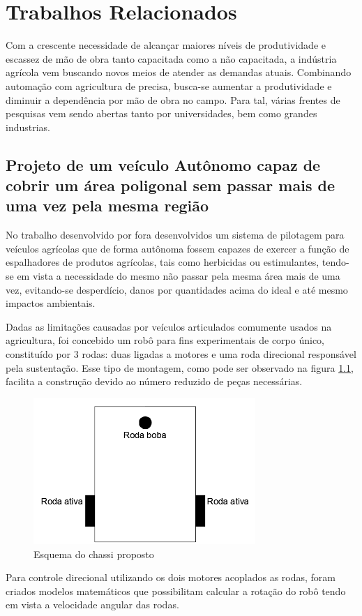 \chapter{Trabalhos Relacionados}
\label{cap:trabalhos:relacionados}
Com a crescente necessidade de alcançar maiores níveis de produtividade e escassez de mão de obra tanto capacitada como a não capacitada, a indústria agrícola vem buscando novos meios de atender as demandas atuais. Combinando automação com agricultura de precisa, busca-se aumentar a produtividade e diminuir a dependência por mão de obra no campo. Para tal, várias frentes de pesquisas vem sendo abertas tanto por universidades, bem como grandes industrias. 

\section{Projeto de um veículo Autônomo capaz de cobrir um área poligonal sem passar mais de uma vez pela mesma região}
No trabalho desenvolvido por \cite{bracht:2015} fora desenvolvidos um sistema de pilotagem para veículos agrícolas que de forma autônoma fossem capazes de exercer a função de espalhadores de produtos agrícolas, tais como herbicidas ou estimulantes, tendo-se em vista a necessidade do mesmo não passar pela mesma área mais de uma vez, evitando-se desperdício, danos por quantidades acima do ideal e até mesmo impactos ambientais.

Dadas as limitações causadas por veículos articulados comumente usados na agricultura, foi concebido um robô para fins experimentais de corpo único, constituído por 3 rodas: duas ligadas a motores e uma roda direcional responsável pela sustentação. Esse tipo de montagem, como pode ser observado na figura \ref{fig:chassi:robo}, facilita a construção devido ao número reduzido de peças necessárias.
\begin{figure}[H]
    \centering
    \includegraphics[width=0.75\textwidth]{figuras/robo bach.png}
    \caption{Esquema do chassi proposto}
    \label{fig:chassi:robo}
\end{figure}
Para controle direcional utilizando os dois motores acoplados as rodas, foram criados modelos matemáticos que possibilitam calcular a rotação do robô tendo em vista a velocidade angular das rodas.

